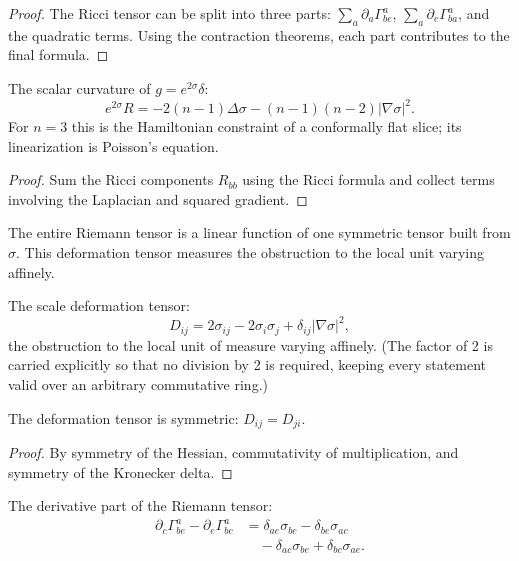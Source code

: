 \begin{proof}
The Ricci tensor can be split into three parts: $\sum_a \partial_a \Gamma^a_{be}$, $\sum_a \partial_e \Gamma^a_{ba}$, and the quadratic terms. Using the contraction theorems, each part contributes to the final formula.
\end{proof}

\begin{theorem}
The scalar curvature of $g = e^{2\sigma}\delta$:
$$e^{2\sigma}R = -2(n-1)\Delta\sigma - (n-1)(n-2)|\nabla\sigma|^2.$$
For $n=3$ this is the Hamiltonian constraint of a conformally flat slice; its linearization is Poisson's equation. 
\end{theorem}

\begin{proof}
Sum the Ricci components $R_{bb}$ using the Ricci formula and collect terms involving the Laplacian and squared gradient.
\end{proof}

The entire Riemann tensor is a linear function of one symmetric tensor built from $\sigma$. This deformation tensor measures the obstruction to the local unit varying affinely.

\begin{definition}
The scale deformation tensor:
$$D_{ij} = 2\sigma_{ij} - 2\sigma_i\sigma_j + \delta_{ij}|\nabla\sigma|^2,$$
the obstruction to the local unit of measure varying affinely. (The factor of 2 is carried explicitly so that no division by 2 is required, keeping every statement valid over an arbitrary commutative ring.) 
\end{definition}

\begin{theorem}
The deformation tensor is symmetric: $D_{ij} = D_{ji}$. 
\end{theorem}

\begin{proof}
By symmetry of the Hessian, commutativity of multiplication, and symmetry of the Kronecker delta.
\end{proof}

\begin{theorem}
The derivative part of the Riemann tensor:
\begin{align*}
\partial_c \Gamma^a_{be} - \partial_e \Gamma^a_{bc} &= \delta_{ae}\sigma_{bc} - \delta_{be}\sigma_{ac} \\
&\quad - \delta_{ac}\sigma_{be} + \delta_{bc}\sigma_{ae}.
\end{align*}
\end{theorem}

